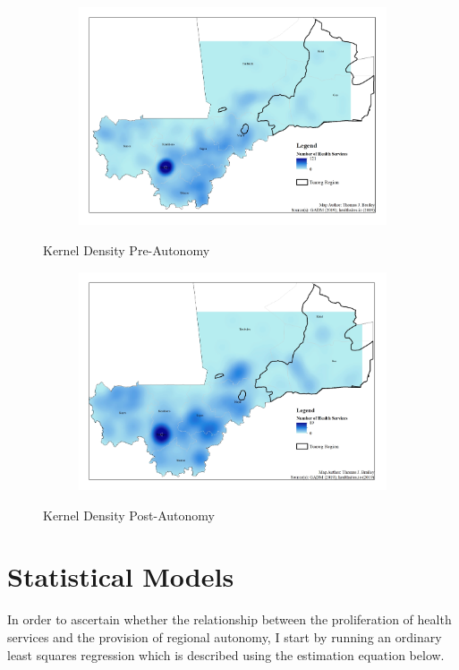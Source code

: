 \documentclass[12pt]{elsarticle}
\begin{document}
\begin{figure}
\centering
\begin{subfigure}{.8\textwidth}
  \centering
  \includegraphics[width=1\linewidth]{tjbrailey_final_project_map_health_kernel_pre.jpg}
\end{subfigure}%
\caption{Kernel Density Pre-Autonomy}
\end{figure}
\begin{figure}
\centering
\begin{subfigure}{.8\textwidth}
  \centering
  \includegraphics[width=1\linewidth]{tjbrailey_final_project_map_health_kernel_post.jpg}
\end{subfigure}%
\caption{Kernel Density Post-Autonomy}
\end{figure}

\section{Statistical Models}
In order to ascertain whether the relationship between the proliferation of health services and the provision of regional autonomy, I start by running an ordinary least squares regression which is described using the estimation equation below. 
\end{document}
